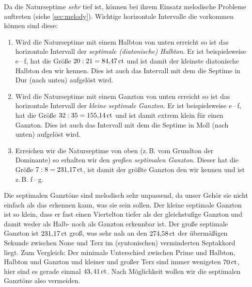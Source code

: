 Da die Naturseptime \emph{sehr} tief ist, können bei ihrem Einsatz melodische
Probleme auftreten (siehe \cref{sec:melody}).
Wichtige horizontale Intervalle die vorkommen können sind diese:
\begin{enumerate}
  \item Wird die Naturseptime mit einem Halbton von unten erreicht so ist das
  horizontale Intervall der \emph{septimale (diatonische) Halbton}. Er ist beispielsweise
  \naturalm e\,–\,\septimal f, hat die Größe $20:21 = 84{,}47\,\text{ct}$ und ist damit
  der kleinste diatonische Halbton den wir kennen. Dies ist auch das Intervall
  mit dem die Septime in Dur (nach unten) aufgelöst wird.
  \item Wird die Naturseptime mit einem Ganzton von unten erreicht so ist das
  horizontale Intervall der \emph{kleine septimale Ganzton}. Er ist beispielsweise \flatp e\,–\,\septimal f, hat die Größe
  $32:35 = 155{,}14\,\text{ct}$ und ist damit extrem klein für einen Ganzton. Dies ist
  auch das Intervall mit dem die Septime in Moll (nach unten) aufgelöst wird.
  \item Erreichen wir die Naturseptime von oben (z.\,B. vom Grundton der
  Dominante) so erhalten wir den \emph{großen septimalen Ganzton}. Dieser hat
  die Größe $7:8 = 231{,}17\,\text{ct}$, ist damit der größte Ganzton den wir kennen und
  ist z.\,B. \septimal f\,–\,g.
\end{enumerate}

Die septimalen Ganztöne sind melodisch sehr unpassend, da unser Gehör sie nicht
einfach als das erkennen kann, was sie sein sollen. Der kleine septimale Ganzton
ist so klein, dass er fast einen Viertelton tiefer als der gleichstufige Ganzton
und damit weder als Halb- noch als Ganzton erkennbar ist. Der große septimale
Ganzton ist $231{,}17\,\text{ct}$ groß, was sehr nah an den $274{,}58\,\text{ct}$ der
übermäßigen Sekunde zwischen None und Terz im (syntonischen) verminderten
Septakkord liegt. Zum Vergleich: Der minimale
Unterschied zwischen Prime und Halbton, Halbton und Ganzton und kleiner und
großer Terz sind immer wenigsten $70\,\text{ct}$, hier sind es gerade einmal $43,41\,\text{ct}$.
Nach Möglichkeit wollen wir die septimalen Ganztöne also vermeiden.

